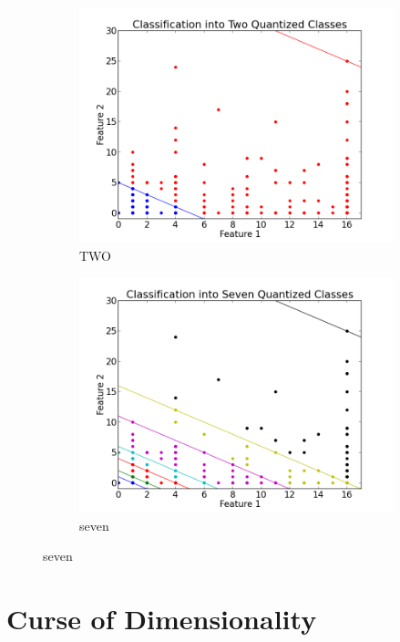 \documentclass[12pt,notitlepage,twoside]{scrreprt}
\begin{document}
\begin{figure}[h!]
\centering
\begin{subfigure}[b]{.49\textwidth}
  \centering
  \includegraphics[width=1.1\linewidth]{figs/two.png}
  \caption{TWO}
  \label{def}
\end{subfigure}
%
\begin{subfigure}[b]{.49\textwidth}
  \centering
  \includegraphics[width=1.1\linewidth]{figs/seven.png}
  \caption{seven}
  \label{html}
\end{subfigure}
\end{figure}

\section{Curse of Dimensionality}
\end{document}
